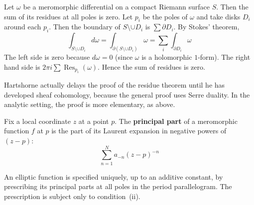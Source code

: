 \documentclass[12pt]{article}
\begin{document}
\begin{remark}
    Let $\omega$ be a meromorphic differential on a compact Riemann surface $S$. Then the sum of its residues at all poles is zero. Let $p_i$ be the poles of $\omega$ and take disks $D_i$ around each $p_i$. Then the boundary of $S \setminus \cup D_i$ is $\sum \partial D_i$. By Stokes' theorem,
    \[
    \int_{S \setminus \cup D_i} d\omega = \int_{\partial (S \setminus \cup D_i)} \omega = \sum_i \int_{\partial D_i} \omega
    \] The left side is zero because $d\omega=0$ (since $\omega$ is a holomorphic $1$-form). The right hand side is $2\pi i \sum \operatorname{Res}_{p_i}(\omega)$. Hence the sum of residues is zero.
\end{remark}
Hartshorne actually delays the proof of the residue theorem until he has developed sheaf cohomology, because the general proof uses Serre duality. In the analytic setting, the proof is more elementary, as above.

\begin{definition}
    Fix a local coordinate $z$ at a point $p$. The \textbf{principal part} of a meromorphic function $f$ at $p$ is the part of its Laurent expansion in negative powers of $(z-p)$:
\[\sum_{n=1}^N a_{-n}(z-p)^{-n}\]
\end{definition}


\begin{theorem}
An elliptic function is specified uniquely, up to an additive constant, 
by prescribing its principal parts at all poles in the period parallelogram. 
The prescription is subject only to condition~(ii).
\end{theorem}
\end{document}
